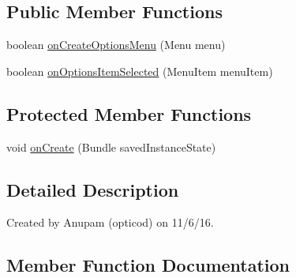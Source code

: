 \subsection*{Public Member Functions}
\begin{DoxyCompactItemize}
\item 
boolean \hyperlink{classorg_1_1buildmlearn_1_1infotemplate_1_1activities_1_1DetailActivity_a3c47fca42868a52474b9aa42519b7103}{on\+Create\+Options\+Menu} (Menu menu)
\item 
boolean \hyperlink{classorg_1_1buildmlearn_1_1infotemplate_1_1activities_1_1DetailActivity_a217176d5df96f106d0f6c8f10aae869a}{on\+Options\+Item\+Selected} (Menu\+Item menu\+Item)
\end{DoxyCompactItemize}
\subsection*{Protected Member Functions}
\begin{DoxyCompactItemize}
\item 
void \hyperlink{classorg_1_1buildmlearn_1_1infotemplate_1_1activities_1_1DetailActivity_aaade56350c54c2e8c984205609f0be66}{on\+Create} (Bundle saved\+Instance\+State)
\end{DoxyCompactItemize}


\subsection{Detailed Description}
Created by Anupam (opticod) on 11/6/16. 

\subsection{Member Function Documentation}
